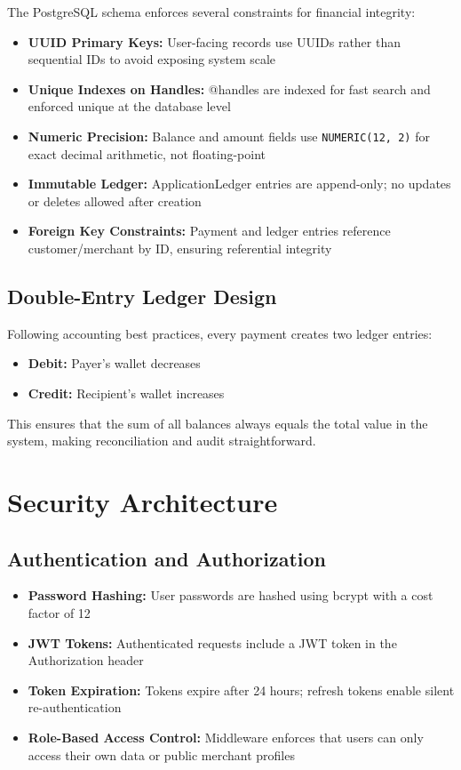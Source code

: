 \documentclass[12pt, a4paper, twoside, openright]{report}
\begin{document}
The PostgreSQL schema enforces several constraints for financial integrity:

\begin{itemize}
    \item \textbf{UUID Primary Keys:} User-facing records use UUIDs rather than sequential IDs to avoid exposing system scale
    \item \textbf{Unique Indexes on Handles:} @handles are indexed for fast search and enforced unique at the database level
    \item \textbf{Numeric Precision:} Balance and amount fields use \texttt{NUMERIC(12, 2)} for exact decimal arithmetic, not floating-point
    \item \textbf{Immutable Ledger:} ApplicationLedger entries are append-only; no updates or deletes allowed after creation
    \item \textbf{Foreign Key Constraints:} Payment and ledger entries reference customer/merchant by ID, ensuring referential integrity
\end{itemize}

\subsection{Double-Entry Ledger Design}

Following accounting best practices, every payment creates two ledger entries:

\begin{itemize}
    \item \textbf{Debit:} Payer's wallet decreases
    \item \textbf{Credit:} Recipient's wallet increases
\end{itemize}

This ensures that the sum of all balances always equals the total value in the system, making reconciliation and audit straightforward.

\section{Security Architecture}

\subsection{Authentication and Authorization}

\begin{itemize}
    \item \textbf{Password Hashing:} User passwords are hashed using bcrypt with a cost factor of 12
    \item \textbf{JWT Tokens:} Authenticated requests include a JWT token in the Authorization header
    \item \textbf{Token Expiration:} Tokens expire after 24 hours; refresh tokens enable silent re-authentication
    \item \textbf{Role-Based Access Control:} Middleware enforces that users can only access their own data or public merchant profiles
\end{itemize}
\end{document}
